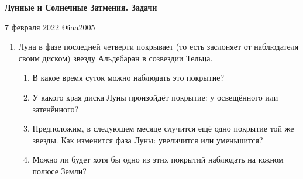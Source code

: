 \documentclass[12pt]{article}
\begin{document}
\begin{center}
{\Large \textbf{Лунные и Солнечные Затмения. Задачи}}
\end{center}
\begin{center}
{\Large 7 февраля 2022 @iaa2005}
\end{center}

\begin{enumerate}
	\item Луна в фазе последней четверти покрывает (то есть заслоняет от наблюдателя своим диском) звезду Альдебаран в созвездии Тельца.
	\begin{enumerate}
 	\item В какое время суток можно наблюдать это покрытие?
 	\item У какого края диска Луны произойдёт покрытие: у освещённого или затенённого?
 	\item Предположим, в следующем месяце случится ещё одно покрытие той же звезды. Как изменится фаза Луны: увеличится или уменьшится?
 	\item Можно ли будет хотя бы одно из этих покрытий наблюдать на южном полюсе Земли?
 	\end{enumerate}
 	

\end{enumerate}
\end{document}
